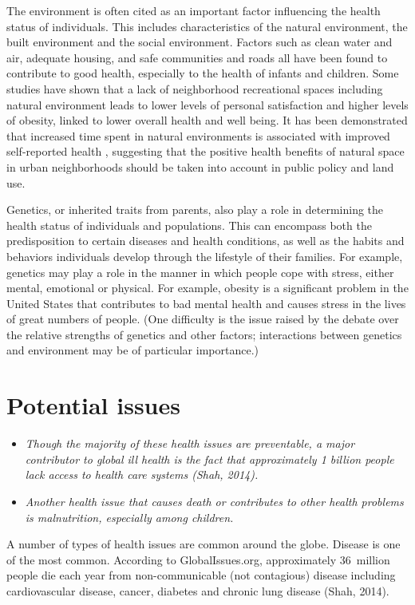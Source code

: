 The environment is often cited as an important factor influencing the
health status of individuals. This includes characteristics of the
natural environment, the built environment and the social environment.
Factors such as clean water and air, adequate housing, and safe
communities and roads all have been found to contribute to good health,
especially to the health of infants and children. Some studies have
shown that a lack of neighborhood recreational spaces including natural
environment leads to lower levels of personal satisfaction and higher
levels of obesity, linked to lower overall health and well being. It has
been demonstrated that increased time spent in natural environments is
associated with improved self-reported health , suggesting that the
positive health benefits of natural space in urban neighborhoods should
be taken into account in public policy and land use.

Genetics, or inherited traits from parents, also play a role in
determining the health status of individuals and populations. This can
encompass both the predisposition to certain diseases and health
conditions, as well as the habits and behaviors individuals develop
through the lifestyle of their families. For example, genetics may play
a role in the manner in which people cope with stress, either mental,
emotional or physical. For example, obesity is a significant problem in
the United States that contributes to bad mental health and causes
stress in the lives of great numbers of people. (One difficulty is the
issue raised by the debate over the relative strengths of genetics and
other factors; interactions between genetics and environment may be of
particular importance.)

\section{Potential issues}\label{potential-issues}

\begin{itemize}
\item
  \emph{Though the majority of these health issues are preventable, a
  major contributor to global ill health is the fact that approximately
  1 billion people lack access to health care systems (Shah, 2014).}
\item
  \emph{Another health issue that causes death or contributes to other
  health problems is malnutrition, especially among children.}
\end{itemize}

A number of types of health issues are common around the globe. Disease
is one of the most common. According to GlobalIssues.org, approximately
36~million people die each year from non-communicable (not contagious)
disease including cardiovascular disease, cancer, diabetes and chronic
lung disease (Shah, 2014).

